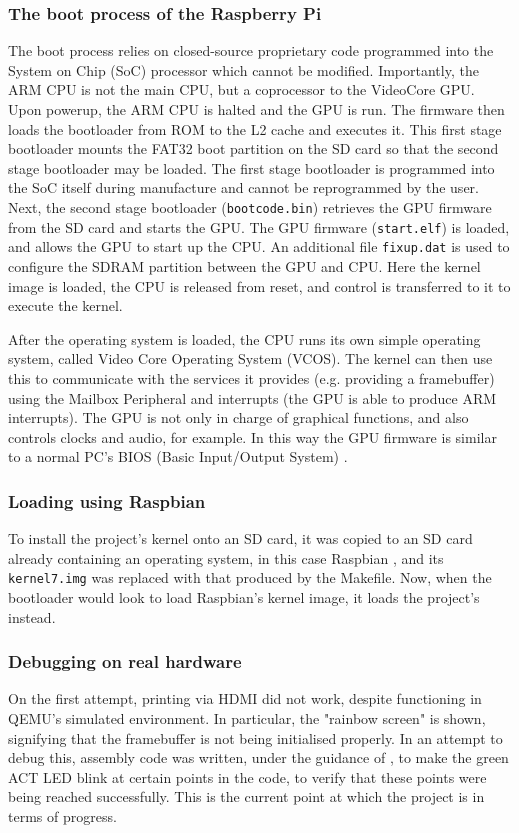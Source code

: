 \documentclass[10pt,a4paper]{article}
\newcommand{\code}[1]{\texttt{#1}}
\begin{document}
\subsubsection*{The boot process of the Raspberry Pi}
The boot process relies on closed-source proprietary code programmed into the
System on Chip (SoC) processor \cite{Firmware} which cannot be modified.
Importantly, the ARM CPU is not the main CPU, but a coprocessor to the VideoCore
GPU. Upon powerup, the ARM CPU is halted and the GPU is run. The firmware then
loads the bootloader from ROM to the L2 cache and executes it.  This first stage
bootloader mounts the FAT32 boot partition on the SD card so that the second
stage bootloader may be loaded. The first stage bootloader is programmed into
the SoC itself during manufacture and cannot be reprogrammed by the user.  Next,
the second stage bootloader (\code{bootcode.bin}) retrieves the GPU firmware
from the SD card and starts the GPU. The GPU firmware (\code{start.elf}) is
loaded, and allows the GPU to start up the CPU. An additional file
\code{fixup.dat} is used to configure the SDRAM partition between the GPU and
CPU.  Here the kernel image is loaded, the CPU is released from reset, and
control is transferred to it to execute the kernel.

After the operating system is loaded, the CPU runs its own simple operating
system, called Video Core Operating System (VCOS). The kernel can then use this
to communicate with the services it provides (e.g. providing a framebuffer)
using the Mailbox Peripheral and interrupts (the GPU is able to produce ARM
interrupts). The GPU is not only in charge of graphical functions, and also
controls clocks and audio, for example. In this way the GPU firmware is similar
to a normal PC's BIOS (Basic Input/Output System) \cite{Boot1, Boot2}.

\subsubsection*{Loading using Raspbian}
To install the project's kernel onto an SD card, it was copied to an SD card
already containing an operating system, in this case Raspbian \cite{Raspbian},
and its \code{kernel7.img} was replaced with that produced by the Makefile. Now,
when the bootloader would look to load Raspbian's kernel image, it loads the
project's instead.

\subsubsection*{Debugging on real hardware}
On the first attempt, printing via HDMI did not work, despite functioning in
QEMU's simulated environment. In particular, the "rainbow screen" is shown,
signifying that the framebuffer is not being initialised properly. In an attempt
to debug this, assembly code was written, under the guidance of \cite{BakingPi},
to make the green ACT LED blink at certain points in the code, to verify that
these points were being reached successfully. This is the current point at which
the project is in terms of progress.
\end{document}
